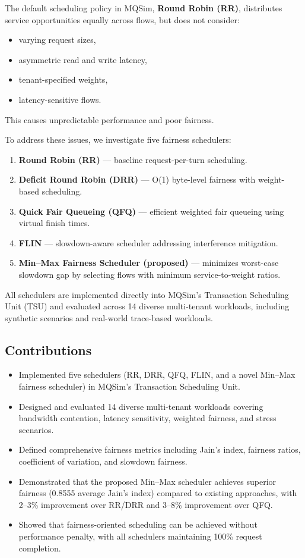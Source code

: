 \documentclass[11pt]{article}
\begin{document}
The default scheduling policy in MQSim, \textbf{Round Robin (RR)}, distributes
service opportunities equally across flows, but does not consider:
\begin{itemize}
    \item varying request sizes,
    \item asymmetric read and write latency,
    \item tenant-specified weights,
    \item latency-sensitive flows.
\end{itemize}
This causes unpredictable performance and poor fairness.

To address these issues, we investigate five fairness schedulers:
\begin{enumerate}
    \item \textbf{Round Robin (RR)} — baseline request-per-turn scheduling.
    \item \textbf{Deficit Round Robin (DRR)} — O(1) byte-level fairness with weight-based scheduling.
    \item \textbf{Quick Fair Queueing (QFQ)} — efficient weighted fair queueing using virtual finish times.
    \item \textbf{FLIN} — slowdown-aware scheduler addressing interference mitigation.
    \item \textbf{Min--Max Fairness Scheduler (proposed)} — minimizes worst-case slowdown gap by selecting flows with minimum service-to-weight ratios.
\end{enumerate}

All schedulers are implemented directly into MQSim's Transaction Scheduling Unit (TSU)
and evaluated across 14 diverse multi-tenant workloads, including synthetic scenarios
and real-world trace-based workloads.

\subsection*{Contributions}
\begin{itemize}
    \item Implemented five schedulers (RR, DRR, QFQ, FLIN, and a novel Min--Max fairness scheduler) in MQSim's Transaction Scheduling Unit.
    \item Designed and evaluated 14 diverse multi-tenant workloads covering bandwidth contention, latency sensitivity, weighted fairness, and stress scenarios.
    \item Defined comprehensive fairness metrics including Jain's index, fairness ratios, coefficient of variation, and slowdown fairness.
    \item Demonstrated that the proposed Min--Max scheduler achieves superior fairness (0.8555 average Jain's index) compared to existing approaches, with 2--3\% improvement over RR/DRR and 3--8\% improvement over QFQ.
    \item Showed that fairness-oriented scheduling can be achieved without performance penalty, with all schedulers maintaining 100\% request completion.
\end{itemize}
\end{document}

